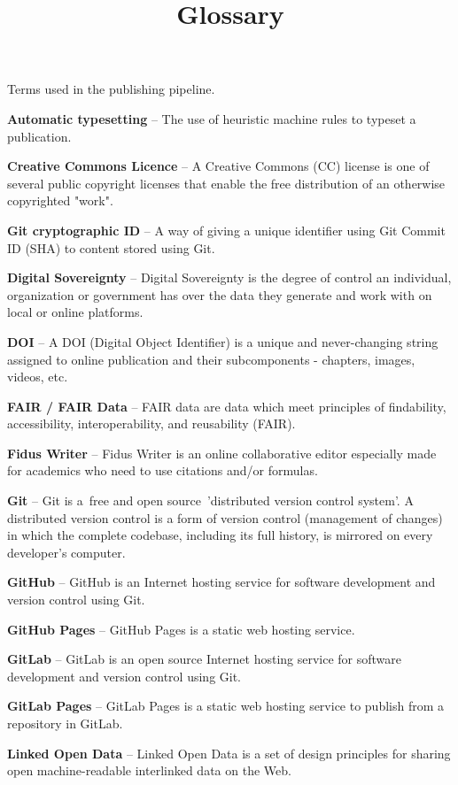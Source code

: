 \documentclass{article}
\begin{document}
\title{Glossary}

\maketitle


Terms used in the publishing pipeline.


\textbf{Automatic typesetting} – The use of heuristic machine rules to typeset a publication.


\textbf{Creative Commons Licence} – A Creative Commons (CC) license is one of several public copyright licenses that enable the free distribution of an otherwise copyrighted "work".


\textbf{Git cryptographic ID} – A way of giving a unique identifier using Git Commit ID (SHA) to content stored using Git.


\textbf{Digital Sovereignty} – Digital Sovereignty is the degree of control an individual, organization or government has over the data they generate and work with on local or online platforms.


\textbf{DOI} – A DOI (Digital Object Identifier) is a unique and never-changing string assigned to online publication and their subcomponents - chapters, images, videos, etc. 


\textbf{FAIR / FAIR Data} – FAIR data are data which meet principles of findability, accessibility, interoperability, and reusability (FAIR).


\textbf{Fidus Writer} – Fidus Writer is an online collaborative editor especially made for academics who need to use citations and/or formulas.


\textbf{Git} – Git is a free and open source 'distributed version control system'. A distributed version control is a form of version control (management of changes) in which the complete codebase, including its full history, is mirrored on every developer's computer.


\textbf{GitHub} – GitHub is an Internet hosting service for software development and version control using Git.


\textbf{GitHub Pages} – GitHub Pages is a static web hosting service.


\textbf{GitLab} – GitLab is an open source Internet hosting service for software development and version control using Git.


\textbf{GitLab Pages} – GitLab Pages is a static web hosting service to publish from a repository in GitLab.


\textbf{Linked Open Data} – Linked Open Data is a set of design principles for sharing open machine-readable interlinked data on the Web. 
\end{document}

